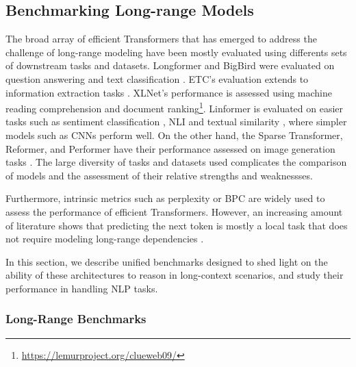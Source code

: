 \subsection{Benchmarking Long-range Models}

The broad array of efficient Transformers that has emerged to address the challenge of long-range modeling have been mostly evaluated using differents sets of downstream tasks and datasets. Longformer and BigBird were evaluated on question answering \citep{yang2018hotpotqa, welbl2018constructing} and text classification \citep{maas2011learning, kiesel2019semeval}. \ac{ETC}'s evaluation extends to information extraction tasks \citep{xiong2019open}. XLNet's performance is assessed using machine reading comprehension \citep{lai2017race} and document ranking\footnote{\url{https://lemurproject.org/clueweb09/}}. Linformer is evaluated on easier tasks such as sentiment classification \citep{maas2011learning, socher2013recursive}, \ac{NLI} \citep{wang2018glue} and textual similarity \citep{wang2017bilateral}, where simpler models such as \acp{CNN} perform well. On the other hand, the Sparse Transformer, Reformer, and Performer have their performance assessed on image generation tasks \citep{parmar2018image}. The large diversity of tasks and datasets used complicates the comparison of models and the assessment of their relative strengths and weaknessses. 

Furthermore, intrinsic metrics such as perplexity or \ac{BPC} are widely used to assess the performance of efficient Transformers. However, an increasing amount of literature shows that predicting the next token is mostly a local task that does not require modeling long-range dependencies \citep{khandelwal2018sharp, sun2021long}. 

In this section, we describe unified benchmarks designed to shed light on the ability of these architectures to reason in long-context scenarios, and study their performance in handling \ac{NLP} tasks.

\subsubsection{Long-Range Benchmarks}

